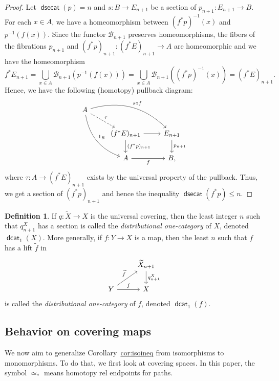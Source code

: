 \documentclass[10pt,a4paper]{amsart}
\let\scr\mathscr %
\theoremstyle{definition}
\newtheorem{definition}{Definition}
\newcommand{\Wi}{\widetilde}
\DeclareMathOperator{\dsecat}{{\mathsf{dsecat}}}
\DeclareMathOperator{\dcat}{{\mathsf{dcat}}}
\def\B{{\scr B}}
\begin{document}
\begin{proof}
    Let $\dsecat(p)=n$ and $s:B\to E_{n+1}$ be a section of $p_{n+1}:E_{n+1}\to B$. For each $x\in A$, we have a homeomorphism between $(f^*p)^{-1}(x)$ and $p^{-1}(f(x))$.
    Since the functor $\B_{n+1}$ preserves homeomorphisms, the fibers of the fibrations $p_{n+1}$ and $(f^*p)_{n+1}:(f^*E)_{n+1}\to A$ are homeomorphic and we have the homeomorphism
    \[
    f^*E_{n+1}=\bigcup_{x\in A} \B_{n+1}\left(p^{-1}(f(x))\right)=\bigcup_{x\in A} \B_{n+1}\left((f^*p)^{-1}(x)\right)=(f^*E)_{n+1}.
    \]
    Hence, we have the following (homotopy) pullback diagram:
    \[\begin{tikzcd}
     A\arrow[ddr, bend right, "1_B"] \arrow[drr, bend left, "s\circ f"] \arrow[dr, dashed, "\tau"] \\
 &
    (f^*E)_{n+1} \arrow{r} \arrow{d}{(f^*p)_{n+1}} & E_{n+1} \arrow[d, "p_{n+1}"] \\
    & A \arrow[swap]{r}{f}                  & B,
    \end{tikzcd}\]
    where $\tau:A\to (f^*E)_{n+1}$ exists by the universal property of the pullback. Thus, we get a section of $(f^*p)_{n+1}$ and hence the inequality $\dsecat(f^*p)\le n$.
\end{proof}

\begin{definition}
    If $q\colon \Wi{X}\to X$ is the universal covering, then the least integer $n$ such that $q_{n+1}^X$ has a section is called the \emph{distributional one-category} of $X$, denoted $\dcat_1(X)$. More generally, if
$f\colon Y \to X$ is a map, then the least $n$ such that $f$ has a lift $\widetilde f$ in
\[
\begin{tikzcd}[contains/.style = {draw=none,"\in" description,sloped}]
&
\widetilde X_{n+1} \arrow{d}{q_{n+1}^X}
\\
Y  \arrow{r}{f} \arrow{ur}{\widetilde{f}}
&
X
\end{tikzcd}
\]
is called the \emph{distributional one-category} of $f$, denoted $\dcat_1(f)$.
\end{definition}

\subsection{Behavior on covering maps}\label{subsec: behavior covering}
We now aim to generalize Corollary~\href{https://arxiv.org/abs/2508.06973v2}{cor:isoineq} from isomorphisms to monomorphisms. To do that, we first look at covering spaces. In this paper, the symbol $\simeq_*$ means homotopy rel endpoints for paths.
\end{document}

